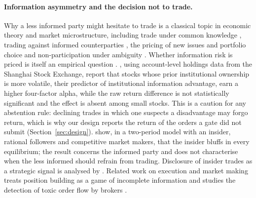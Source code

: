 \documentclass[11pt]{article}
\theoremstyle{remark}
\begin{document}
\paragraph{Information asymmetry and the decision not to trade.}
Why a less informed party might hesitate to trade is a classical topic in economic theory and
market microstructure, including trade under common knowledge \citep{milgrom1982information},
trading against informed counterparties \citep{kyle1985continuous,glosten1985bid}, the pricing of
new issues \citep{rock1986new} and portfolio choice and non-participation under ambiguity
\citep{dow1992uncertainty,easley2009ambiguity}. Whether information risk is priced is itself an
empirical question \citep{easley2002information}. \citet{choi2013informed}, using account-level
holdings data from the Shanghai Stock Exchange, report that stocks whose prior institutional
ownership is more volatile, their predictor of institutional information advantage, earn a
higher four-factor alpha, while the raw return difference is not statistically significant and
the effect is absent among small stocks. This is a caution for any abstention rule: declining
trades in which one suspects a disadvantage may forgo return, which is why our design reports
the return of the orders a gate did not submit (Section~\ref{sec:design}).
\citet{chakraborty2008bluffing} show, in a two-period model with an insider, rational followers
and competitive market makers, that the insider bluffs in every equilibrium; the result concerns
the informed party and does not characterise when the less informed should refrain from trading.
Disclosure of insider trades as a strategic signal is analysed by \citet{huddart2001disclosure}.
Related work on execution and market making treats position building as a game of incomplete
information \citep{chriss2025position} and studies the detection of toxic order flow by brokers
\citep{cartea2026toxic,cartea2025simple}.
\end{document}

